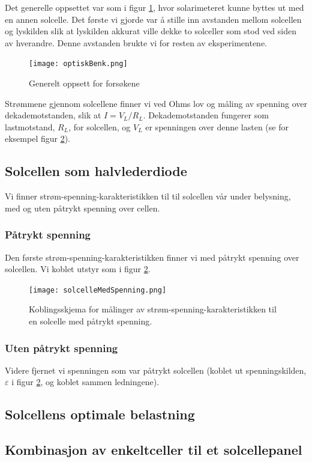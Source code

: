\documentclass[a4paper,11pt, twocolumn]{article}
\begin{document}
Det generelle oppsettet var som i figur \ref{fig:oppsett}, hvor solarimeteret kunne byttes ut med en annen solcelle. Det første vi gjorde var å stille inn avstanden mellom solcellen og lyskilden slik at lyskilden akkurat ville dekke to solceller som stod ved siden av hverandre. Denne avstanden brukte vi for resten av eksperimentene.
\begin{figure}[ht!]
	\texttt{[image: optiskBenk.png]}
	\caption{Generelt oppsett for forsøkene}
	\label{fig:oppsett}
\end{figure}
Strømmene gjennom solcellene finner vi ved Ohms lov og måling av spenning over dekademotstanden, slik at $I = V_L/R_L$. Dekademotstanden fungerer som lastmotstand, $R_L$, for solcellen, og $V_L$ er spenningen over denne lasten (se for eksempel figur \ref{fig:solcelleMedSpenning}).
\subsection{Solcellen som halvlederdiode}
Vi finner strøm-spenning-karakteristikken til til solcellen vår under belysning, med og uten påtrykt spenning over cellen.
\subsubsection{Påtrykt spenning}
Den første strøm-spenning-karakteristikken finner vi med påtrykt spenning over solcellen. Vi koblet utstyr som i figur \ref{fig:solcelleMedSpenning}.

\begin{figure}[!ht]
	\texttt{[image: solcelleMedSpenning.png]}
	\caption{Koblingsskjema for målinger av strøm-spenning-karakteristikken til en solcelle med påtrykt spenning.}
	\label{fig:solcelleMedSpenning}
\end{figure}

\subsubsection{Uten påtrykt spenning}
Videre fjernet vi spenningen som var påtrykt solcellen (koblet ut spenningskilden, $\varepsilon$ i figur \ref{fig:solcelleMedSpenning}, og koblet sammen ledningene).

\subsection{Solcellens optimale belastning}

\subsection{Kombinasjon av enkeltceller til et solcellepanel}
\end{document}
